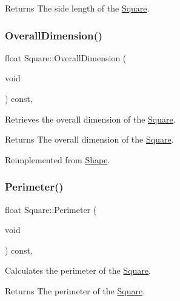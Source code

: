 \begin{DoxyReturn}{Returns}
The side length of the \mbox{\hyperlink{class_square}{Square}}. 
\end{DoxyReturn}
\mbox{\label{class_square_abf97ea232b41e2060eff7a3d8b1b60d2}} 
\subsubsection{\texorpdfstring{OverallDimension()}{OverallDimension()}}
{\footnotesize\ttfamily float Square\+::\+Overall\+Dimension (\begin{DoxyParamCaption}\item[{void}]{ }\end{DoxyParamCaption}) const\hspace{0.3cm}{\ttfamily [override]}, {\ttfamily [virtual]}}



Retrieves the overall dimension of the \mbox{\hyperlink{class_square}{Square}}. 

\begin{DoxyReturn}{Returns}
The overall dimension of the \mbox{\hyperlink{class_square}{Square}}. 
\end{DoxyReturn}


Reimplemented from \mbox{\hyperlink{class_shape_a60aea90f45ea0f6d60cd749918728e16}{Shape}}.

\mbox{\label{class_square_a460111c0c374f9864d00316dcfe35dba}} 
\subsubsection{\texorpdfstring{Perimeter()}{Perimeter()}}
{\footnotesize\ttfamily float Square\+::\+Perimeter (\begin{DoxyParamCaption}\item[{void}]{ }\end{DoxyParamCaption}) const\hspace{0.3cm}{\ttfamily [override]}, {\ttfamily [virtual]}}



Calculates the perimeter of the \mbox{\hyperlink{class_square}{Square}}. 

\begin{DoxyReturn}{Returns}
The perimeter of the \mbox{\hyperlink{class_square}{Square}}. 
\end{DoxyReturn}


